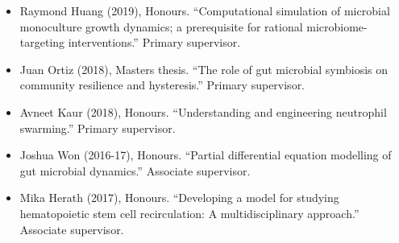 \documentclass[a4paper]{article}
\begin{document}
\begin{itemize}



    \item Raymond Huang (2019), Honours. ``Computational simulation of microbial monoculture growth dynamics; a prerequisite for rational microbiome-targeting interventions.'' Primary supervisor.



    \item Juan Ortiz (2018), Masters thesis. ``The role of gut microbial symbiosis on community resilience and hysteresis.'' Primary supervisor.


    \item Avneet Kaur (2018), Honours. ``Understanding and engineering neutrophil swarming.'' Primary supervisor.

\item Joshua Won (2016-17), Honours. ``Partial differential equation modelling of gut microbial dynamics.'' Associate supervisor. %

\item Mika Herath (2017), Honours. ``Developing a model for studying hematopoietic stem cell recirculation: A multidisciplinary approach.'' Associate supervisor. %


\end{itemize}
\end{document}
